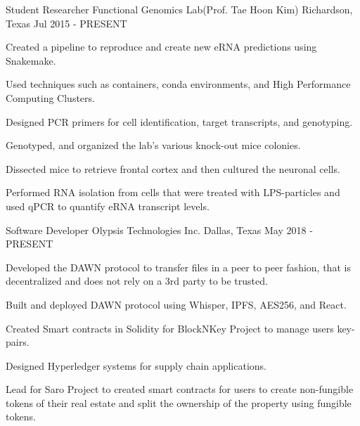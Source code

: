 

\begin{cventries}

	\cventry
	{Student Researcher} %
	{Functional Genomics Lab(Prof. Tae Hoon Kim)} %
	{Richardson, Texas} %
	{Jul 2015 - PRESENT} %
	{
		\begin{cvitems} %
			\item {Created a pipeline to reproduce and create new eRNA
			            predictions using Snakemake.}
			\item {Used techniques such as containers, conda environments, and High
			            Performance Computing Clusters.}
			\item {Designed PCR primers for cell identification, target transcripts, and genotyping.}
			\item {Genotyped, and organized the lab's various knock-out mice colonies.}
			\item {Dissected mice to retrieve frontal cortex and then cultured the neuronal cells.}
			\item {Performed RNA isolation from cells that were treated with LPS-particles and used qPCR to quantify eRNA transcript levels.}
		\end{cvitems}
	}

	\cventry
	{Software Developer} %
	{Olypsis Technologies Inc.} %
	{Dallas, Texas} %
	{May 2018 - PRESENT} %
	{
		\begin{cvitems} %
			\item {Developed the DAWN protocol to transfer files in a peer to peer fashion, that is decentralized and does not rely on a 3rd party to be trusted.}
			\item {Built and deployed DAWN protocol using Whisper, IPFS, AES256, and React.}
			\item {Created Smart contracts in Solidity for BlockNKey Project to manage users key-pairs.}
			\item {Designed Hyperledger systems for supply chain applications.}
			\item {Lead for Saro Project to created smart contracts for users to create non-fungible tokens of their real estate and split the ownership of the property using fungible tokens.}
		\end{cvitems}
	}


\end{cventries}
